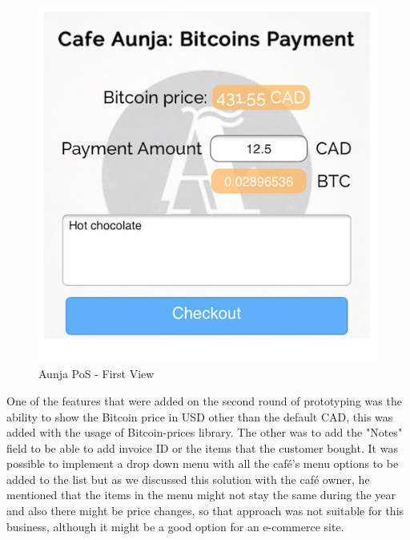 \begin{figure}[htb!p]
\centering
\includegraphics[scale=0.5]{fig/First_View.png}
  \caption{Aunja PoS - First View}
\label{fig:First_View}
\end{figure}

One of the features that were added on the second round of prototyping was the ability to show the Bitcoin price in USD other than the default CAD, this was added with the usage of Bitcoin-prices library. The other was to add the "Notes" field to be able to add invoice ID or the items that the customer bought. It was possible to implement a drop down menu with all the caf\'{e}'s menu options to be added to the list but as we discussed this solution with the caf\'{e}  owner, he mentioned that the items in the menu might not stay the same during the year and also there might be price changes, so that approach was not suitable for this business, although it might be a good option for an e-commerce site.

